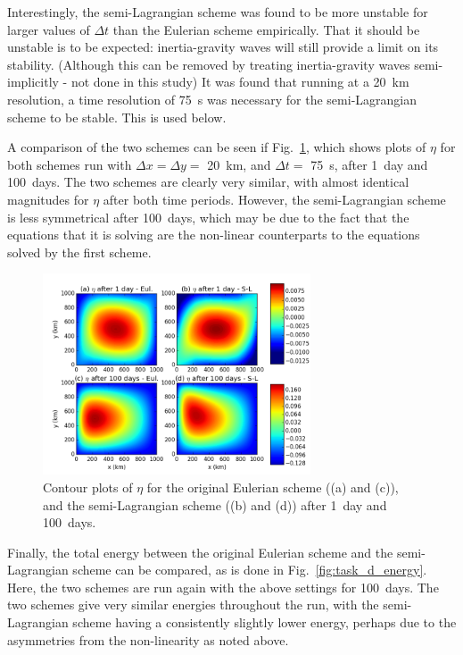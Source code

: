\documentclass{article}
\begin{document}
Interestingly, the semi-Lagrangian scheme was found to be more unstable for larger values of $\Delta
t$ than the Eulerian scheme empirically. That it should be unstable is to be expected:
inertia-gravity waves will still provide a limit on its stability. (Although this can be removed by
treating inertia-gravity waves semi-implicitly - not done in this study) It was found that running
at a \SI{20}{km} resolution, a time resolution of \SI{75}{s} was necessary for the semi-Lagrangian
scheme to be stable. This is used below.

A comparison of the two schemes can be seen if Fig.\ \ref{fig:task_d_eta}, which shows plots of
$\eta$ for both schemes run with $\Delta x = \Delta y = $ \SI{20}{km}, and $\Delta t = $
\SI{75}{s}, after \SI{1}{day} and \SI{100}{days}. The two schemes are clearly very similar, with
almost identical magnitudes for $\eta$ after both time periods. However, the semi-Lagrangian scheme
is less symmetrical after \SI{100}{days}, which may be due to the fact that the equations that it is
solving are the non-linear counterparts to the equations solved by the first scheme.

\begin{figure}[ht!]
    \centering
    \includegraphics[width=300px]{figures/task_d_eta}
    \caption{Contour plots of $\eta$ for the original Eulerian scheme ((a) and (c)), and the
	semi-Lagrangian scheme ((b) and (d)) after \SI{1}{day} and \SI{100}{days}.}
    \label{fig:task_d_eta}
\end{figure}

Finally, the total energy between the original Eulerian scheme and the semi-Lagrangian scheme can be
compared, as is done in Fig.\ \ref{fig:task_d_energy}. Here, the two schemes are run again with the
above settings for \SI{100}{days}. The two schemes give very similar energies throughout the run,
with the semi-Lagrangian scheme having a consistently slightly lower energy, perhaps due to the
asymmetries from the non-linearity as noted above.
\end{document}
